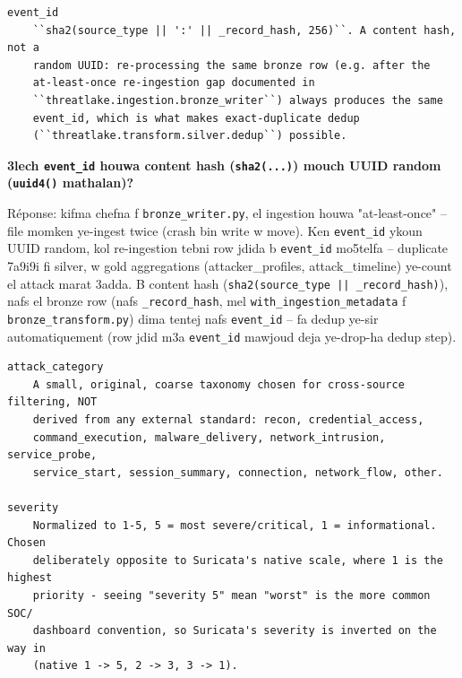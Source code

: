 \documentclass[11pt,a4paper]{report}
\DeclareRobustCommand{\code}[1]{\texttt{#1}}
\begin{document}
\begin{lstlisting}[style=pystyle]
event_id
    ``sha2(source_type || ':' || _record_hash, 256)``. A content hash, not a
    random UUID: re-processing the same bronze row (e.g. after the
    at-least-once re-ingestion gap documented in
    ``threatlake.ingestion.bronze_writer``) always produces the same
    event_id, which is what makes exact-duplicate dedup
    (``threatlake.transform.silver.dedup``) possible.
\end{lstlisting}

\begin{soual}
\textbf{3lech \code{event\_id} houwa content hash (\code{sha2(...)}) mouch
UUID random (\code{uuid4()} mathalan)?}

Réponse: kifma chefna f \code{bronze\_writer.py}, el ingestion houwa
"at-least-once" -- file momken ye-ingest twice (crash bin write w move).
Ken \code{event\_id} ykoun UUID random, kol re-ingestion tebni row jdida
b \code{event\_id} mo5telfa -- duplicate 7a9i9i fi silver, w gold
aggregations (attacker\_profiles, attack\_timeline) ye-count el attack
marat 3adda. B content hash (\code{sha2(source\_type || \_record\_hash)}),
nafs el bronze row (nafs \code{\_record\_hash}, mel \code{with\_ingestion\_metadata}
f \code{bronze\_transform.py}) dima tentej nafs \code{event\_id} -- fa
dedup ye-sir automatiquement (row jdid m3a \code{event\_id} mawjoud deja
ye-drop-ha dedup step).
\end{soual}

\begin{lstlisting}[style=pystyle]
attack_category
    A small, original, coarse taxonomy chosen for cross-source filtering, NOT
    derived from any external standard: recon, credential_access,
    command_execution, malware_delivery, network_intrusion, service_probe,
    service_start, session_summary, connection, network_flow, other.

severity
    Normalized to 1-5, 5 = most severe/critical, 1 = informational. Chosen
    deliberately opposite to Suricata's native scale, where 1 is the highest
    priority - seeing "severity 5" mean "worst" is the more common SOC/
    dashboard convention, so Suricata's severity is inverted on the way in
    (native 1 -> 5, 2 -> 3, 3 -> 1).
\end{lstlisting}
\end{document}
